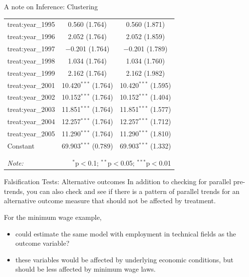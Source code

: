\documentclass[
  ignorenonframetext,
]{beamer}
\begin{document}
\begin{frame}[fragile]{A note on Inference: Clustering}
\begin{table}[!htbp]
\begin{tabular}{@{\extracolsep{5pt}}lcc}
  treat:year\_1995 & 0.560 (1.764) & 0.560 (1.871) \\ 
  treat:year\_1996 & 2.052 (1.764) & 2.052 (1.859) \\ 
  treat:year\_1997 & $-$0.201 (1.764) & $-$0.201 (1.789) \\ 
  treat:year\_1998 & 1.034 (1.764) & 1.034 (1.760) \\ 
  treat:year\_1999 & 2.162 (1.764) & 2.162 (1.982) \\ 
  treat:year\_2001 & 10.420$^{***}$ (1.764) & 10.420$^{***}$ (1.595) \\ 
  treat:year\_2002 & 10.152$^{***}$ (1.764) & 10.152$^{***}$ (1.404) \\ 
  treat:year\_2003 & 11.851$^{***}$ (1.764) & 11.851$^{***}$ (1.577) \\ 
  treat:year\_2004 & 12.257$^{***}$ (1.764) & 12.257$^{***}$ (1.712) \\ 
  treat:year\_2005 & 11.290$^{***}$ (1.764) & 11.290$^{***}$ (1.810) \\ 
  Constant & 69.903$^{***}$ (0.789) & 69.903$^{***}$ (1.332) \\ 
 \hline \\[-1.8ex] 
\hline 
\hline \\[-1.8ex] 
\textit{Note:}  & \multicolumn{2}{r}{$^{*}$p$<$0.1; $^{**}$p$<$0.05; $^{***}$p$<$0.01} \\ 
\end{tabular} 
\end{table}
\end{frame}

\begin{frame}{Falsification Tests: Alternative outcomes}
\protect\hypertarget{falsification-tests-alternative-outcomes}{}
In addition to checking for parallel pre-trends, you can also check and
see if there is a pattern of parallel trends for an alternative outcome
measure that should not be affected by treatment.

For the minimum wage example,

\begin{itemize}
\item
  could estimate the same model with employment in technical fields as
  the outcome variable?
\item
  these variables would be affected by underlying economic conditions,
  but should be less affected by minimum wage laws.
\end{itemize}
\end{frame}
\end{document}
